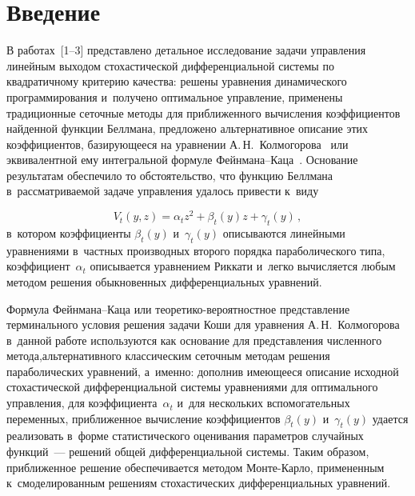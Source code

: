 
  
\vspace*{9pt}



\thispagestyle{headings}

\begin{multicols}{2}

\label{st\stat}

\section{Введение}

\vspace*{-4pt}

     В работах~[1--3] представлено детальное исследование задачи 
управления линейным выходом стохастической дифференциальной системы 
по квадратичному критерию качества: решены уравнения динамического 
программирования и~получено оптимальное управление, применены 
традиционные сеточные методы для приближенного вычисления 
коэффициентов найденной функции Беллмана, предложено альтернативное 
описание этих коэффициентов, базирующееся на уравнении 
А.\,Н.~Колмогорова~\cite{4-bos} или эквивалентной ему интегральной 
формуле Фейн\-ма\-на--Ка\-ца~\cite{5-bos}. Основание результатам 
обеспечило то обстоятельство, что функцию Беллмана в~рассматриваемой 
задаче управления удалось привести к~виду

\noindent
\begin{equation}
V_t(y,z)=\alpha_t z^2+ \beta_t(y)z+ \gamma_t(y)\,,
\label{e1a-bos}
\end{equation}
 в~котором коэффициенты $\beta_t(y)$ 
и~$\gamma_t(y)$ описываются линейными уравнениями в~частных производных 
второго порядка параболического типа, коэффициент~$\alpha_t$ описывается 
уравнением Риккати и~легко вычисляется любым методом решения 
обыкновенных дифференциальных уравнений.
     
     Формула Фейн\-ма\-на--Ка\-ца или тео\-ре\-ти\-ко-ве\-ро\-ят\-ност\-ное 
представление терминального условия решения задачи Коши для уравнения 
А.\,Н.~Колмогорова в~данной работе используются как основание для 
представления численного метода,\linebreak альтернативного классическим сеточным 
методам решения параболических уравнений, а~именно: дополнив 
имеющееся описание исходной стохастической дифференциальной системы 
уравнениями для оптимального управления, для коэффициента~$\alpha_t$ 
и~для нескольких вспомогательных переменных, приближенное вычисление 
коэффициентов $\beta_t(y)$ и~$\gamma_t(y)$ удается реализовать в~форме 
статистического оценивания параметров случайных функций~--- решений 
общей дифференциальной сис\-те\-мы. Таким образом, приближенное решение 
обеспечивается методом Мон\-те-Кар\-ло, примененным к~смоделированным 
решениям стохастических дифференциальных уравнений. 
     

\end{multicols}
